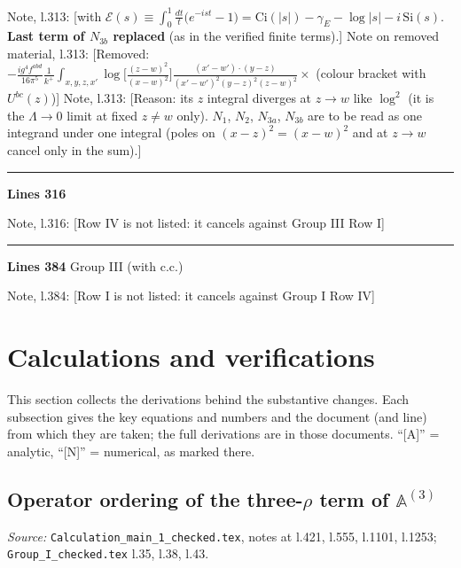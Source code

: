 \documentclass[10pt]{article}
\newenvironment{notebox}{\def\FrameCommand{{\color{notebar}\vrule width 1.5pt}\hspace{6pt}}\MakeFramed{\advance\hsize-\width\FrameRestore}\small}{\endMakeFramed}
\def\mf#1{\mathbb{#1}}
\begin{document}
\begin{notebox}\textsf{\small Note, l.313:} [with $\mathcal{E}(s)\equiv\int_{0}^{1}\frac{dt}{t}\big(e^{-ist}-1\big)=\mathrm{Ci}(|s|)-\gamma_{E}-\log|s|-i\,\mathrm{Si}(s)$. \textbf{Last term of $N_{3b}$ replaced} (as in the verified finite terms).]\end{notebox}
\begin{notebox}\textsf{\small Note on removed material, l.313:} [Removed: $-\frac{ig^{4}f^{abd}}{16\pi^{5}}\frac{1}{k^{+}}\int_{x,y,z,x'}\log\big[\frac{(z-w)^{2}}{(x-w)^{2}}\big]\frac{(x'-w')\cdot(y-z)}{(x'-w')^{2}(y-z)^{2}(z-w)^{2}}\times$ (colour bracket with $U^{bc}(z)$)]\end{notebox}
\begin{notebox}\textsf{\small Note, l.313:} [Reason: its $z$ integral diverges at $z\to w$ like $\log^{2}$ (it is the $\Lambda\to0$ limit at fixed $z\neq w$ only). $N_{1}$, $N_{2}$, $N_{3a}$, $N_{3b}$ are to be read as one integrand under one integral (poles on $(x-z)^{2}=(x-w)^{2}$ and at $z\to w$ cancel only in the sum).]\end{notebox}
\noindent\rule{\linewidth}{0.3pt}\par\noindent\textbf{Lines 316}\par
\begin{notebox}\textsf{\small Note, l.316:} [Row IV is not listed: it cancels against Group III Row I]\end{notebox}
\noindent\rule{\linewidth}{0.3pt}\par\noindent\textbf{Lines 384} \quad \textsf{Group III (with c.c.)}\par
\begin{notebox}\textsf{\small Note, l.384:} [Row I is not listed: it cancels against Group I Row IV]\end{notebox}
\clearpage
\section{Calculations and verifications}\label{sec:calc}
\noindent This section collects the derivations behind the substantive changes. Each subsection gives the key equations and numbers and the document (and line) from which they are taken; the full derivations are in those documents. ``[A]'' = analytic, ``[N]'' = numerical, as marked there.

\subsection{Operator ordering of the three-$\rho$ term of $\mf{A}^{(3)}$}\label{sec:calc-order}
\noindent\emph{Source:} \texttt{Calculation\_main\_1\_checked.tex}, notes at l.421, l.555, l.1101, l.1253; \texttt{Group\_I\_checked.tex} l.35, l.38, l.43.
\end{document}
